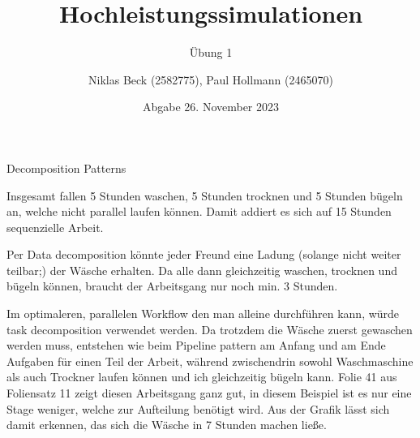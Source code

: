 \documentclass[
ngerman,
subtask=ruled %
]{tudaexercise}
\begin{document}
	
	\title[Übung Hochleistungssimulationen]{Hochleistungssimulationen}
	\subtitle{\"Ubung 1}
	\author{Niklas Beck (2582775), Paul Hollmann (2465070)}
	\date{Abgabe 26. November 2023}
	\maketitle
	
	
	\begin{task}{Decomposition Patterns}
		\begin{subtask}[title=]
			Insgesamt fallen 5 Stunden waschen, 5 Stunden trocknen und 5 Stunden bügeln an, welche nicht parallel laufen können.
			Damit addiert es sich auf 15 Stunden sequenzielle Arbeit.
		\end{subtask}
		\begin{subtask}[title=]
			Per Data decomposition könnte jeder Freund eine Ladung (solange nicht weiter teilbar;) der Wäsche erhalten.
			Da alle dann gleichzeitig waschen, trocknen und bügeln können, braucht der Arbeitsgang nur noch min. 3 Stunden.
		\end{subtask}
		\begin{subtask}[title=]
			Im optimaleren, parallelen Workflow den man alleine durchführen kann, würde task decomposition verwendet werden.
			Da trotzdem die Wäsche zuerst gewaschen werden muss, entstehen wie beim Pipeline pattern am Anfang und am Ende Aufgaben für einen Teil der Arbeit, während zwischendrin sowohl Waschmaschine als auch Trockner laufen können und ich gleichzeitig bügeln kann.
			Folie 41 aus Foliensatz 11 zeigt diesen Arbeitsgang ganz gut, in diesem Beispiel ist es nur eine Stage weniger, welche zur Aufteilung benötigt wird.
			Aus der Grafik lässt sich damit erkennen, das sich die Wäsche in 7 Stunden machen ließe.
		\end{subtask}
	\end{task}
	
\end{document}
